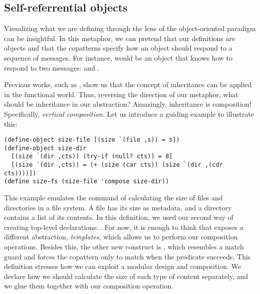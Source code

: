


\subsection{Self-referrential objects}

Visualizing what we are defining through the lens of the object-oriented paradigm can be insightful.
In this metaphor, we can pretend that our definitions are objects and that the copatterns specify how an object should respond to a sequence of messages.
For instance,  would be an object that knows how to respond to two messages:   and .

Previous works, such as \cite{Brown2009FunctionI}, show us that the concept of inheritance can be applied in the functional world.
Thus, reversing the direction of our metaphor, what should be inheritance in our abstraction? 
Amazingly, inheritance is composition! Specifically, \emph{vertical composition}.
Let us introduce a guiding example to illustrate this:
\begin{verbatim}
(define-object size-file [(size `(file ,s)) = s])
(define-object size-dir
  [(size `(dir ,cts)) (try-if (null? cts)) = 8]
  [(size `(dir ,cts)) = (+ (size (car cts)) (size `(dir ,(cdr cts))))])
(define size-fs (size-file 'compose size-dir))
\end{verbatim}
This example emulates the command of calculating the size of files and directories in a file system.
A file has its size as metadata, and a directory contains a list of its contents.
In this definition, we used our second way of creating top-level declarations: .
For now, it is enough to think that  exposes a different abstraction, \emph{templates}, which allows us to perform our composition operations.
Besides this, the other new construct is , which resembles a match guard and forces the copattern only to match when the predicate  succeeds.
This definition stresses how we can exploit a modular design and composition.
We declare how we should calculate the size of each type of content separately, and we glue them together with our composition operation.

